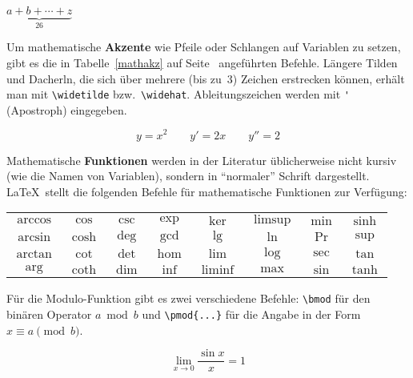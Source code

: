\begin{LTXexample}
$\underbrace{a+b+\cdots+z}_{26}$
\end{LTXexample}

 
Um mathematische \textbf{Akzente} wie Pfeile oder Schlangen auf
Variablen zu setzen, gibt es die in Tabelle~\ref{mathakz} auf
Seite~\pageref{mathakz} angeführten Befehle.
Längere Tilden und Dacherln, die sich über mehrere (bis zu~3)
Zeichen erstrecken können, erhält man mit \lstinline|\widetilde|
bzw.\ \lstinline|\widehat|.
Ableitungszeichen werden mit \lstinline|'| (Apostroph) eingegeben.

\begin{LTXexample}
\begin{displaymath}
y=x^{2} \qquad
y'=2x   \qquad
y''=2
\end{displaymath}
\end{LTXexample}

 
Mathematische \textbf{Funktionen} werden in der Literatur
üblicherweise nicht kursiv (wie die Namen von Variablen),
sondern in "`normaler"' Schrift dargestellt.
\LaTeX\ stellt die folgenden Befehle für mathematische
Funktionen zur Verfügung:

\begin{LTXexample}[pos=b]
\begin{tabular}{@{}*{8}{>{$}c<{$}}@{}}
\arccos & \cos  & \csc & \exp & \ker    & \limsup & \min & \sinh \\
\arcsin & \cosh & \deg & \gcd & \lg     & \ln     & \Pr  & \sup  \\
\arctan & \cot  & \det & \hom & \lim    & \log    & \sec & \tan  \\
\arg    & \coth & \dim & \inf & \liminf & \max    & \sin & \tanh \\
\end{tabular}
\end{LTXexample}

Für die Modulo-Funktion gibt es zwei verschiedene Befehle:
\lstinline|\bmod| für den binären Operator \(a \bmod b\) und
\lstinline|\pmod{...}| für die Angabe in der Form \(x\equiv a
\pmod{b}\).
 
\begin{LTXexample}
\begin{displaymath}
\lim_{x \to 0} \frac{\sin x}{x}
=1
\end{displaymath}
\end{LTXexample}
 
